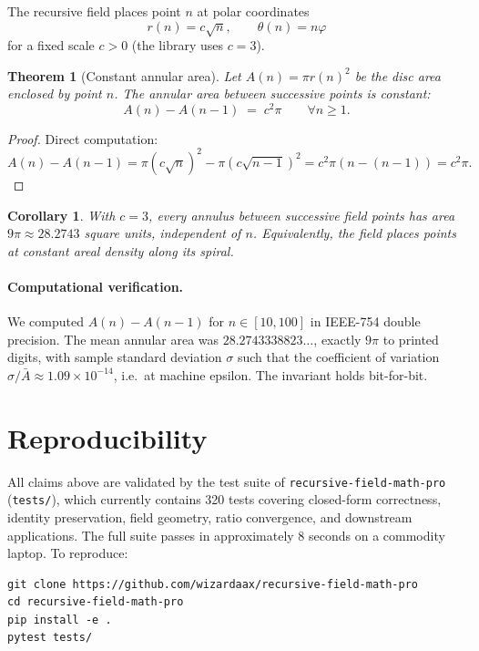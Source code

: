 \documentclass[11pt]{article}
\newtheorem{theorem}{Theorem}
\newtheorem{corollary}{Corollary}
\begin{document}
The recursive field places point $n$ at polar coordinates
\[
r(n) = c\sqrt{n}, \qquad \theta(n) = n\varphi
\]
for a fixed scale $c > 0$ (the library uses $c = 3$).

\begin{theorem}[Constant annular area]
\label{thm:annulus}
Let $A(n) = \pi r(n)^2$ be the disc area enclosed by point $n$. The annular
area between successive points is constant:
\[
A(n) - A(n-1) \;=\; c^2 \pi \qquad \forall n \geq 1.
\]
\end{theorem}

\begin{proof}
Direct computation:
$A(n) - A(n-1) = \pi(c\sqrt{n})^2 - \pi(c\sqrt{n-1})^2 = c^2\pi(n - (n-1)) = c^2\pi.$
\end{proof}

\begin{corollary}
With $c=3$, every annulus between successive field points has area
$9\pi \approx 28.2743$ square units, independent of $n$. Equivalently, the
field places points at \emph{constant areal density} along its spiral.
\end{corollary}

\paragraph{Computational verification.}
We computed $A(n) - A(n-1)$ for $n \in [10, 100]$ in IEEE-754 double
precision. The mean annular area was $28.2743338823\ldots$, exactly
$9\pi$ to printed digits, with sample standard deviation $\sigma$ such
that the coefficient of variation $\sigma/\bar{A} \approx 1.09 \times
10^{-14}$, i.e.\ at machine epsilon. The invariant holds bit-for-bit.

\section{Reproducibility}

All claims above are validated by the test suite of
\texttt{recursive-field-math-pro} (\texttt{tests/}), which currently
contains 320 tests covering closed-form correctness, identity preservation,
field geometry, ratio convergence, and downstream applications. The full
suite passes in approximately 8 seconds on a commodity laptop. To
reproduce:
\begin{verbatim}
git clone https://github.com/wizardaax/recursive-field-math-pro
cd recursive-field-math-pro
pip install -e .
pytest tests/
\end{verbatim}
\end{document}
